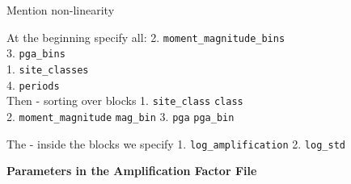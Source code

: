 Mention non-linearity

At the beginning specify all:
2. \texttt{moment\_magnitude\_bins} \\
3. \texttt{pga\_bins} \\
1. \texttt{site\_classes} \\
4. \texttt{periods} \\

Then - sorting over blocks 
1. \texttt{site\_class} \texttt{class}\\
2. \texttt{moment\_magnitude} \texttt{mag\_bin}
3. \texttt{pga} \texttt{pga\_bin}

The - inside the blocks we specify
1. \texttt{log\_amplification}
2. \texttt{log\_std}

\textbf{Parameters in the Amplification Factor File}


